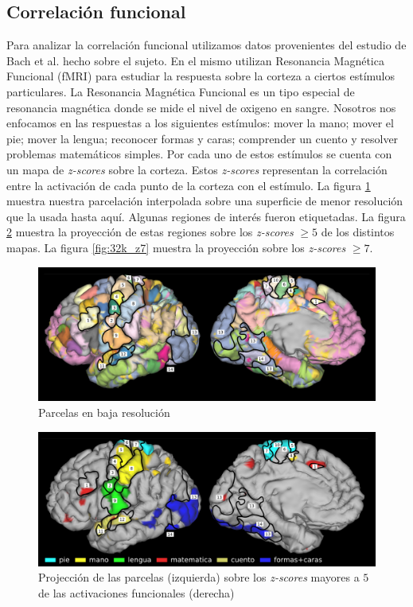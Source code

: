 \subsection{Correlaci\'on funcional}

Para analizar la correlaci\'on funcional utilizamos datos provenientes
del estudio de Bach et al. \cite{Barch2013} hecho sobre el sujeto. En el
mismo utilizan Resonancia Magn\'etica Funcional (fMRI) para estudiar la
respuesta sobre la corteza a ciertos est\'imulos particulares. La 
Resonancia Magn\'etica Funcional es un tipo especial de resonancia 
magn\'etica donde se mide el nivel de oxigeno en sangre. Nosotros nos
enfocamos en las respuestas a los siguientes est\'imulos: mover la mano;
mover el pie; mover la lengua; reconocer formas y caras; comprender un
cuento y resolver problemas matem\'aticos simples. Por cada uno de estos
est\'imulos se cuenta con un mapa de \textit{z-scores} sobre la corteza.
Estos \textit{z-scores} representan la correlaci\'on entre la activaci\'on
de cada punto de la corteza con el est\'imulo. La figura \ref{fig:32k}
muestra nuestra parcelaci\'on interpolada sobre una superficie de menor
resoluci\'on que la usada hasta aqu\'i. Algunas regiones de inter\'es
fueron etiquetadas. La figura \ref{fig:32k_z5} muestra la proyecci\'on de
estas regiones sobre los \textit{z-scores} $ \geq 5$ de los distintos
mapas. La figura \ref{fig:32k_z7} muestra la proyecci\'on sobre los
\textit{z-scores} $ \geq 7$.
 
\begin{figure}[h!]
    \includegraphics[width=\textwidth]{img/32k_labels.png}
    \caption{Parcelas en baja resoluci\'on}
    \label{fig:32k}
\end{figure}


\begin{figure}[h!]
    \includegraphics[width=\textwidth]{img/32k_z5.png}
    \caption{Projecci\'on de las parcelas (izquierda) sobre los \textit{z-scores}
    mayores a $5$ de las activaciones funcionales (derecha)}
    \label{fig:32k_z5}
\end{figure}

